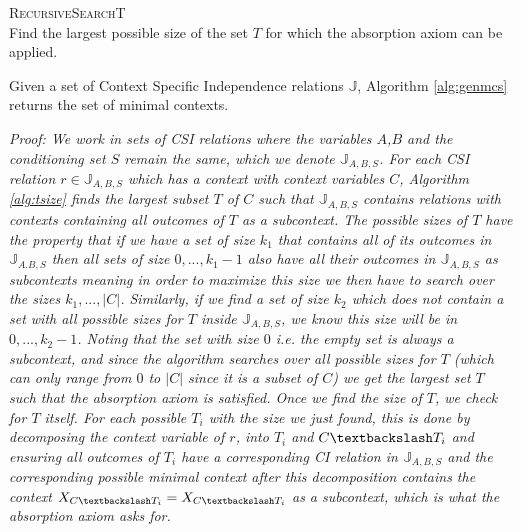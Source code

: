 \documentclass{tufte-book}
\begin{document}
\begin{Definition}
\begin{algorithm}
\caption{\textsc{RecursiveSearchT} \\ Find the largest possible size of the set $T$ for which the absorption axiom can be applied.}

\end{algorithm}


\begin{theorem}\label{alg:genmcscorrectness}
Given a set of Context Specific Independence relations $\mathbb{J}$, Algorithm \ref{alg:genmcs} returns the set of minimal contexts.
\end{theorem}


\textit{Proof: We work in sets of CSI relations where the variables $A$,$B$ and the conditioning set $S$ remain the same, which we denote $\mathbb{J}_{A,B,S}$. For each CSI relation $r \in \mathbb{J}_{A,B,S}$ which has a context with context variables $C$, Algorithm \ref{alg:tsize} finds the largest subset $T$ of $C$ such that $\mathbb{J}_{A,B,S}$ contains relations with contexts containing all outcomes of $T$ as a subcontext. The possible sizes of $T$ have the property that if we have a set of size $k_1$ that contains all of its outcomes in $\mathbb{J}_{A.B,S}$ then all sets of size $0,...,k_1-1$ also have all their outcomes in $\mathbb{J}_{A,B,S}$ as subcontexts meaning in order to maximize this size we then have to search over the sizes $k_1,...,|C|$. Similarly, if we find a set of size $k_2$ which does not contain a set with all possible sizes for $T$ inside $\mathbb{J}_{A,B,S}$, we know this size will be in $0,...,k_2-1$. Noting that the set with size $0$ i.e. the empty set is always a subcontext, and since the algorithm searches over all possible sizes for $T$ (which can only range from $0$ to $|C|$ since it is a subset of $C$) we get the largest set $T$ such that the absorption axiom is satisfied. Once we find the size of $T$, we check for $T$ itself. For each possible $T_i$ with the size we just found, this is done by decomposing the context variable of $r$, into $T_i$ and $C\textbackslash T_i$ and ensuring all outcomes of $T_i$ have a corresponding CI relation in $\mathbb{J}_{A,B,S}$ and the corresponding possible minimal context after this decomposition contains the context $X_{C\textbackslash T_i} = X_{C \textbackslash T_i}$ as a subcontext, which is what the absorption axiom asks for.}


\end{Definition}
\end{document}
